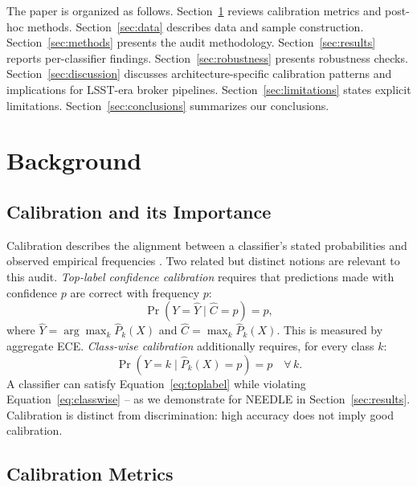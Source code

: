 \documentclass[a4paper,fleqn,usenatbib]{mnras}
\begin{document}
The paper is organized as follows. Section~\ref{sec:background}
reviews calibration metrics and post-hoc methods.
Section~\ref{sec:data} describes data and sample construction.
Section~\ref{sec:methods} presents the audit methodology.
Section~\ref{sec:results} reports per-classifier findings.
Section~\ref{sec:robustness} presents robustness checks.
Section~\ref{sec:discussion} discusses architecture-specific
calibration patterns and implications for LSST-era broker pipelines.
Section~\ref{sec:limitations} states explicit limitations.
Section~\ref{sec:conclusions} summarizes our conclusions.

\section{Background} \label{sec:background}

\subsection{Calibration and its Importance}\label{sec:calibration}

Calibration describes the alignment between a classifier's stated
probabilities and observed empirical frequencies \citep{dawid1982}.
Two related but distinct notions are relevant to this audit.
\textit{Top-label confidence calibration} \citep{guo2017} requires
that predictions made with confidence $p$ are correct with frequency $p$:
\begin{equation}
    \Pr(Y = \hat{Y} \mid \hat{C} = p) = p,
    \label{eq:toplabel}
\end{equation}
where $\hat{Y} = \arg\max_k \hat{P}_k(X)$ and
$\hat{C} = \max_k \hat{P}_k(X)$. This is measured by aggregate ECE.
\textit{Class-wise calibration} \citep{nixon2019} additionally
requires, for every class $k$:
\begin{equation}
    \Pr(Y = k \mid \hat{P}_k(X) = p) = p \quad \forall\, k.
    \label{eq:classwise}
\end{equation}
A classifier can satisfy Equation~\ref{eq:toplabel} while violating
Equation~\ref{eq:classwise} -- as we demonstrate for NEEDLE in
Section~\ref{sec:results}. Calibration is distinct from
discrimination: high accuracy does not imply good calibration.

\subsection{Calibration Metrics}\label{sec:metrics}
\end{document}
